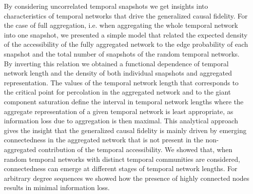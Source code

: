 \documentclass[%
 reprint,
 amsmath,amssymb,
 aps,
]{revtex4-2}
\begin{document}
By considering uncorrelated temporal snapshots we get insights into characteristics of temporal networks that drive the generalized causal fidelity. For the case of full aggregation, i.e. when aggregating the whole temporal network into one snapshot,  we presented a simple model that related the expected density of the accessibility of the fully aggregated network to the edge probability of each snapshot and the total number of snapshots of the random temporal networks.  
By inverting this relation we obtained a functional dependence of temporal network length and the density of both individual snapshots and aggregated representation. The values of the temporal network length that corresponds to the critical point for percolation in the aggregated network and to the giant component saturation define the interval in temporal network lengths where the aggregate representation of a given temporal network is least appropriate, as information loss due to aggregation is then maximal. 
This analytical approach gives the insight that the generalized causal fidelity is mainly driven by emerging connectedness in the aggregated network that is not present in the non-aggregated contribution of the temporal accessibility. 
We showed that, when random temporal networks with distinct temporal communities are considered, connectedness can emerge at different stages of temporal network lengths.
For arbitrary degree sequences we showed how the presence of highly connected nodes results in minimal information loss.
\end{document}
